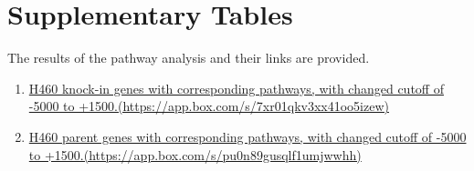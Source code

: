 \documentclass[11pt]{article}
\begin{document}
\section*{Supplementary Tables}  

The results of the pathway analysis and their links are provided.

\begin{enumerate}

	\item \href{https://app.box.com/s/7xr01qkv3xx41oo5izew}{H460 knock-in genes with corresponding pathways, with changed cutoff of -5000 to +1500.(https://app.box.com/s/7xr01qkv3xx41oo5izew)} 
%	
	\item \href{https://app.box.com/s/pu0n89gusqlf1umjwwhh}{H460 parent genes with corresponding pathways,  with changed cutoff of -5000 to +1500.(https://app.box.com/s/pu0n89gusqlf1umjwwhh)}
\end{enumerate}

 

 
\end{document}
